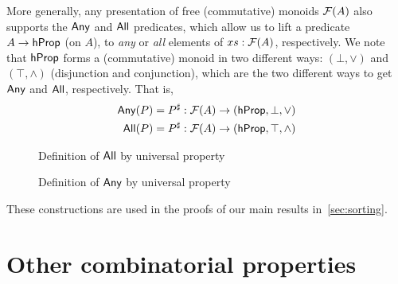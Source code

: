 More generally, any presentation of free (commutative) monoids $\mathcal{F}(A)$ also supports the
$\operatorname{\mathsf{Any}}$ and $\operatorname{\mathsf{All}}$ predicates, which allow us to lift a predicate $A \to \mathsf{hProp}$ (on $A$),
to \emph{any} or \emph{all} elements of $xs : \mathcal{F}(A)$, respectively.
%
We note that $\mathsf{hProp}$ forms a (commutative) monoid in two different ways: $(\bot,\vee)$ and $(\top,\wedge)$
(disjunction and conjunction), which are the two different ways to get $\operatorname{\mathsf{Any}}$ and $\operatorname{\mathsf{All}}$, respectively.
That is,
\begin{align*}
    \mathsf{Any}(P) & = {P}^{\sharp} : \mathcal{F}(A) \to (\mathsf{hProp}, \bot, \vee)   \\
    \mathsf{All}(P) & = {P}^{\sharp} : \mathcal{F}(A) \to (\mathsf{hProp}, \top, \wedge)
\end{align*}
\begin{figure}[H]
    \centering
    \begin{minipage}[t]{0.49\textwidth}
        \centering
        \caption{Definition of $\operatorname{\mathsf{All}}$ by universal property}
    \end{minipage}
    \begin{minipage}[t]{0.49\textwidth}
        \centering
        \caption{Definition of $\operatorname{\mathsf{Any}}$ by universal property}
    \end{minipage}
\end{figure}
These constructions are used in the proofs of our main results in~\cref{sec:sorting}.

\section{Other combinatorial properties}

